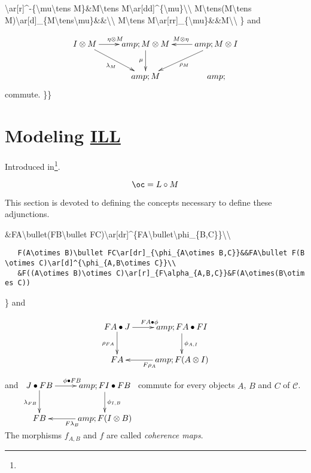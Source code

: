 \textbackslash{}ar{[}r{]}\^{}-\{\textbackslash{}mu\textbackslash{}tens
M\}\&M\textbackslash{}tens
M\textbackslash{}ar{[}dd{]}\^{}\{\textbackslash{}mu\}\textbackslash{}\textbackslash{}
M\textbackslash{}tens(M\textbackslash{}tens
M)\textbackslash{}ar{[}d{]}\_\{M\textbackslash{}tens\textbackslash{}mu\}\&\&\textbackslash{}\textbackslash{}
M\textbackslash{}tens
M\textbackslash{}ar{[}rr{]}\_\{\textbackslash{}mu\}\&\&M\textbackslash{}\textbackslash{}
\} and

\[\xymatrix{
I\tens M\ar[r]^{\eta\tens M}\ar[dr]_{\lambda_M}&amp;M\tens M\ar[d]_\mu&amp;\ar[l]_{M\tens\eta}\ar[dl]^{\rho_M}M\tens I\\
&amp;M&amp;
}\] commute. \}\}

\section{\texorpdfstring{Modeling \hyperref[intuitionistic-linear-logic]{ILL}}{Modeling ILL}}\label{modeling-ill}

Introduced in\footnote{}.

\[\oc=L\circ M\]

This section is devoted to defining the concepts necessary to define
these adjunctions.

\&FA\textbackslash{}bullet(FB\textbackslash{}bullet
FC)\textbackslash{}ar{[}dr{]}\^{}\{FA\textbackslash{}bullet\textbackslash{}phi\_\{B,C\}\}\textbackslash{}\textbackslash{}

\texttt{~~~F(A\textbackslash{}otimes~B)\textbackslash{}bullet~FC\textbackslash{}ar{[}dr{]}\_\{\textbackslash{}phi\_\{A\textbackslash{}otimes~B,C\}\}\&\&FA\textbackslash{}bullet~F(B\textbackslash{}otimes~C)\textbackslash{}ar{[}d{]}\^{}\{\textbackslash{}phi\_\{A,B\textbackslash{}otimes~C\}\}\textbackslash{}\textbackslash{}}\\
\texttt{~~~\&F((A\textbackslash{}otimes~B)\textbackslash{}otimes~C)\textbackslash{}ar{[}r{]}\_\{F\textbackslash{}alpha\_\{A,B,C\}\}\&F(A\textbackslash{}otimes(B\textbackslash{}otimes~C))}

\} and

\[\xymatrix{
    FA\bullet J\ar[d]_{\rho_{FA}}\ar[r]^{FA\bullet\phi}&amp;FA\bullet FI\ar[d]^{\phi_{A,I}}\\
    FA&amp;\ar[l]^{F\rho_A}F(A\otimes I)
}\] and \(\xymatrix{
    J\bullet FB\ar[d]_{\lambda_{FB}}\ar[r]^{\phi\bullet FB}&amp;FI\bullet FB\ar[d]^{\phi_{I,B}}\\
    FB&amp;\ar[l]^{F\lambda_B}F(I\otimes B)
}\) commute for every objects \(A\), \(B\) and \(C\) of \(\mathcal{C}\).
The morphisms \(f_{A,B}\) and \(f\) are called \emph{coherence maps}.

